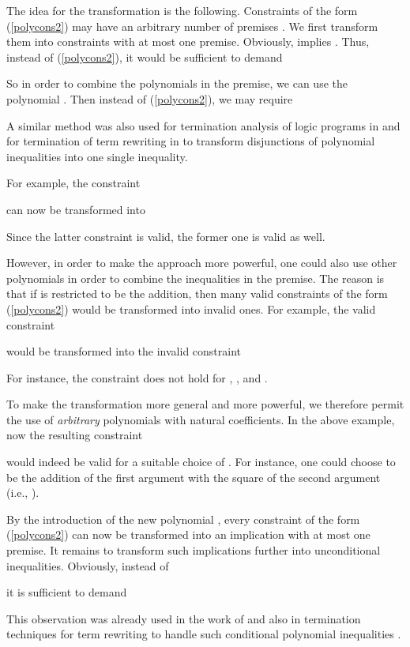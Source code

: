 \documentclass[envcountsame]{tlp}
\newcounter{polycons2ctr}
\newcounter{polycons1ctr}
\newcounter{ex:der-lastsymconsctr}
\begin{document}
The idea for the transformation is the following. Constraints
of the form (\ref{polycons2}) may have an arbitrary number  of
premises . We first transform them into
constraints with at most 
one premise. 
Obviously,  implies . Thus, instead
of (\ref{polycons2}), it would be sufficient to demand


So in order to combine the  polynomials in the premise, we can use the
polynomial . Then instead
of (\ref{polycons2}), we may require

A similar method
was also used  for termination
analysis of logic programs in \cite{Decorteetal98} and  for termination of term rewriting
in \cite[Section 7.2]{JAR07} to transform
disjunctions of polynomial inequalities into one single inequality.


For example, the constraint

can now be transformed into

Since the latter constraint is valid, the former one is valid as well.

However, in order to make the approach more powerful, one could also use other
polynomials  in order to combine the  inequalities in the
premise. The reason is that if  is restricted to be the
addition, then many valid constraints of the form (\ref{polycons2}) would be
transformed into invalid ones. For example, the valid constraint

would be transformed into the invalid constraint

For instance, the constraint does not hold for
, , and .



To make the transformation more general and more powerful,
we therefore permit
the use of \emph{arbitrary} polynomials  with natural
coefficients. In the above example, now the resulting constraint

would indeed be valid for a suitable choice of . For instance,
one could choose  to be the addition of the first argument with
the square of the second argument (i.e., ). 

By the introduction of the new polynomial , 
every constraint of the form (\ref{polycons2}) can now be transformed into an
implication with at most one premise. It remains to
transform such implications further into unconditional 
inequalities.
Obviously, instead of 

it is sufficient to demand 

This observation
was already used in the work of \cite{Decorteetal98} and also in termination
techniques for term rewriting  
to handle such conditional
polynomial inequalities
\cite{CADE98,CADE07}.
\end{document}
